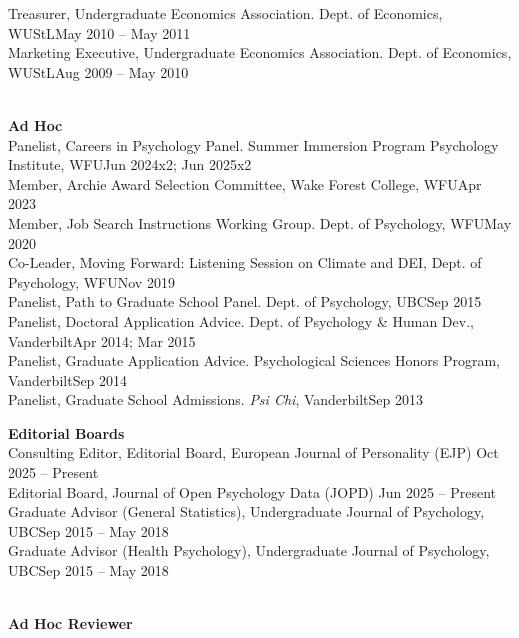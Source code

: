 \begin{minipage}{\linewidth}\vspace{1.1mm} Treasurer, Undergraduate Economics Association. Dept. of Economics, WUStL\hfill{May 2010 – May 2011}\\
Marketing Executive, Undergraduate Economics Association. Dept. of Economics, WUStL\hfill {Aug 2009 – May 2010}\end{minipage}\medskip\\
\textrm{\textbf{Ad Hoc}}\\
Panelist, Careers in Psychology Panel. Summer Immersion Program Psychology Institute, WFU\hfill {Jun 2024x2; Jun 2025x2}\\ %
Member, Archie Award Selection Committee, Wake Forest College, WFU\hfill{Apr 2023}\\
Member, Job Search Instructions Working Group. Dept. of Psychology, WFU\hfill{May 2020}\\
Co-Leader, Moving Forward: Listening Session on Climate and DEI, Dept. of Psychology, WFU\hfill {Nov 2019}\\
Panelist, Path to Graduate School Panel. Dept. of Psychology, UBC\hfill {Sep 2015}\\
Panelist, Doctoral Application Advice. Dept. of Psychology \& Human Dev., Vanderbilt\hfill {Apr 2014; Mar 2015}\\
Panelist, Graduate Application Advice. Psychological Sciences Honors Program, Vanderbilt\hfill {Sep 2014}\\
Panelist, Graduate School Admissions. \textit{Psi Chi}, Vanderbilt\hfill{Sep 2013}\medskip\\
%
%
\begin{minipage}{\linewidth}\vspace{1.1mm} {\large \textbf{Editorial Boards}}\\
Consulting Editor, Editorial Board, European Journal of Personality (EJP) \hfill{Oct 2025 – Present}\\
Editorial Board, Journal of Open Psychology Data (JOPD) \hfill{Jun 2025 – Present}\\
Graduate Advisor (General Statistics), Undergraduate Journal of Psychology, UBC\hfill{Sep 2015 – May 2018}\\
Graduate Advisor (Health Psychology), Undergraduate Journal of Psychology, UBC\hfill{Sep 2015 – May 2018}\end{minipage}\medskip\\
{\large \textbf{Ad Hoc Reviewer}}\smallskip\\
